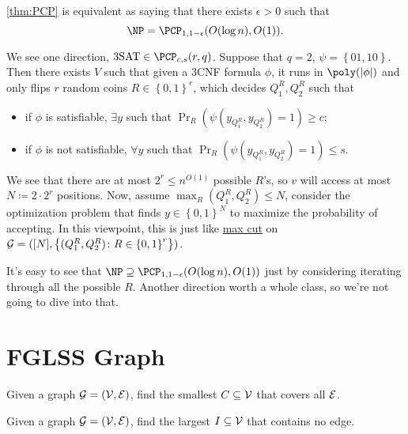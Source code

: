 \begin{remark}
	\autoref{thm:PCP} is equivalent as saying that there exists \(\epsilon > 0\) such that
	\[
		\NP = \PCP_{1, 1-\epsilon }(O(\log n), O(1)).
	\]
\end{remark}
\begin{explanation}
	We see one direction, \(\text{3SAT}\in \PCP_{c, s}(r, q) \). Suppose that \(q = 2\), \(\psi = \left\{ 01, 10 \right\} \). Then there exists \(V\) such that given a 3CNF formula \(\phi \), it runs in \(\poly(\vert \phi  \vert )\) and only flips \(r\) random coins \(R\in \left\{ 0, 1 \right\} ^r\), which decides \(Q_1^R, Q_2^R\) such that
	\begin{itemize}
		\item if \(\phi \) is satisfiable, \(\exists y\) such that \(\Pr_{R}(\psi (y_{Q_1^R}, y_{Q_2^R}) = 1) \geq c\);
		\item if \(\phi \) is not satisfiable, \(\forall y\) such that \(\Pr_{R}(\psi (y_{Q_1^R}, y_{Q_2^R}) = 1) \leq s\).
	\end{itemize}
	We see that there are at most \(2^r \leq n^{O(1)}\) possible \(R\)'s, so \(v\) will access at most \(N\coloneqq 2\cdot 2^r\) positions. Now, assume \(\max _R (Q_1^R, Q_2^R) \leq N\), consider the optimization problem that finds \(y\in \left\{ 0, 1 \right\} ^N\) to maximize the probability of accepting. In this viewpoint, this is just like \hyperref[prb:max-cut]{max cut} on \(\mathcal{\MakeUppercase{g}} =([N], \left\{ (Q_1^R, Q_2^R)\colon R\in \left\{ 0, 1 \right\} ^r \right\} )\).
\end{explanation}

It's easy to see that \(\NP \supseteq \PCP_{1, 1-\epsilon }(O(\log n), O(1))\) just by considering iterating through all the possible \(R\). Another direction worth a whole class, so we're not going to dive into that.

\section{FGLSS Graph}
\cite{10.1145/226643.226652}
\begin{problem}\label{prb:vertex-cover}
Given a graph \(\mathcal{\MakeUppercase{g}} =(\mathcal{\MakeUppercase{v}} , \mathcal{\MakeUppercase{e}} )\), find the smallest \(C \subseteq \mathcal{\MakeUppercase{v}} \) that covers all \(\mathcal{\MakeUppercase{e}} \).
\end{problem}

\begin{problem}\label{prb:independent-set}
Given a graph \(\mathcal{\MakeUppercase{g}} =(\mathcal{\MakeUppercase{v}} , \mathcal{\MakeUppercase{e}} )\), find the largest \(I \subseteq \mathcal{\MakeUppercase{v}} \) that contains no edge.
\end{problem}

